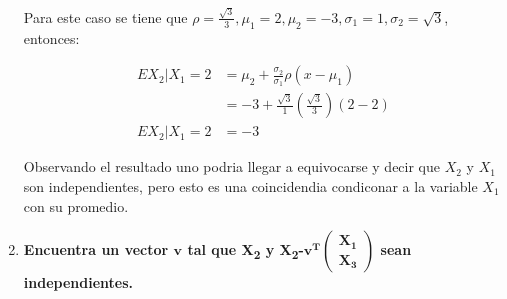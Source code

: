 \begin{enumerate}
          Para este caso se tiene que $\rho = \frac{\sqrt{3}}{3}, \mu_1=2, \mu_2 = -3,\sigma_1=1 ,\sigma_2 = \sqrt{3}$, entonces:

          \begin{align*}
              EX_2 | X_1=2 & = \mu_2 + \frac{\sigma_2}{\sigma_1} \rho (x-\mu_1)              \\
                           & = -3 + \frac{\sqrt{3}}{1}\left (\frac{\sqrt{3}}{3}\right )(2-2) \\
              EX_2 | X_1=2 & = -3
          \end{align*}

          Observando el resultado uno podria llegar a equivocarse y decir que $X_2$ y $X_1$ son independientes, pero esto es una coincidendia condiconar a la variable $X_1$ con su promedio.

    \item \textbf{Encuentra un vector $\mathbf{v}$ tal que X\textsubscript{2} y X\textsubscript{2}-$\mathbf{v^T \begin{pmatrix} X_1 \\ X_3 \end{pmatrix}}$ sean independientes.}
\end{enumerate}